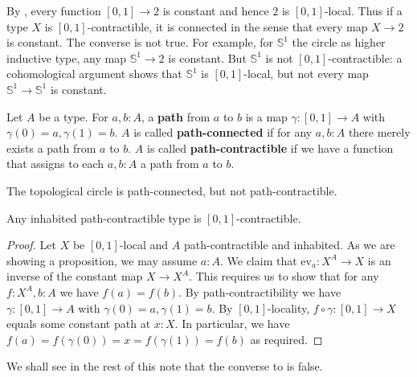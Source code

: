 \begin{remark}\label{contractibleVSconnected}
  By , every function $[0,1]\to 2$ is constant and hence $2$ is $[0,1]$-local. 
  Thus if a type $X$ is $[0,1]$-contractible, it is connected in the sense that every map $X \to 2$ is constant. 
  The converse is not true. For example, for $\mathbb S^1$ the circle as higher inductive type, any map $\mathbb S^1 \to 2$ is constant. But $\mathbb S^1$ is not $[0,1]$-contractible: a cohomological argument \parencite[3.4.4.ii]{ssd-cohomology-draft} shows that $\mathbb S^1$ is $[0,1]$-local, but not every map $\mathbb S^1 \to \mathbb S^1$ is constant. 
\end{remark}

\begin{definition}
  Let $A$ be a type. For $a,b:A$, a \textbf{path} from $a$ to $b$ is a map $\gamma:[0,1]\to A$ with $\gamma(0) = a,\gamma(1) = b$. 
  $A$ is called \textbf{path-connected} if for any $a,b:A$ there merely exists a path from $a$ to $b$.
  $A$ is called \textbf{path-contractible} if we have a function that assigns to each $a,b:A$ a path from $a$ to $b$. 
\end{definition} 
\begin{example}
  The topological circle is path-connected, but not path-contractible. 
\end{example}
\begin{lemma}\label{pathContractibleToLocalizationContractible}
  Any inhabited path-contractible type is $[0,1]$-contractible. 
\end{lemma}
\begin{proof}
  Let $X$ be $[0,1]$-local and $A$ path-contractible and inhabited. As we are showing a proposition, we may assume $a:A$. We claim that $\mathrm{ev}_a:X^A\to X$ is an inverse of the constant map $X \to X^A$. 
  This requires us to show that for any $f:X^A, b:A$ we have $f(a) = f(b)$. 
  By path-contractibility we have $\gamma:[0,1]\to A$ with $\gamma(0) = a,\gamma(1) = b$. 
  By $[0,1]$-locality, $f\circ \gamma : [0,1] \to X$ equals some constant path at $x:X$. 
  In particular, we have $f(a) = f(\gamma(0)) = x = f(\gamma(1)) = f(b)$ as required. 
\end{proof}
We shall see in the rest of this note that the converse to  is false. %
